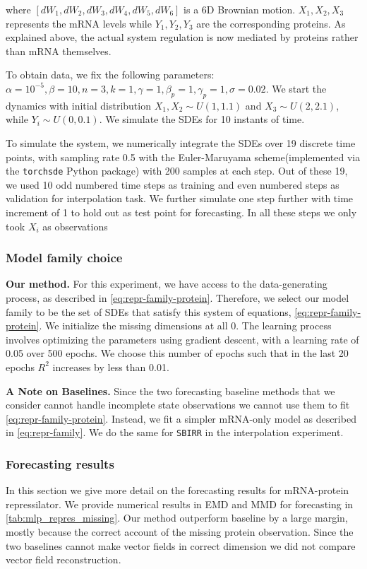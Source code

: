 where $[dW_1,dW_2,dW_3, dW_4, dW_5, dW_6]$ is a 6D Brownian motion. $X_1,X_2,X_3$ represents the mRNA levels while $Y_1, Y_2, Y_3$ are the corresponding proteins. As explained above, the actual system regulation is now mediated by proteins rather than mRNA themselves. 

To obtain data, we fix the following parameters: $\alpha = 10^{-5}, \beta = 10, n=3, k = 1, \gamma = 1,\beta_p=1, \gamma_p = 1, \sigma = 0.02$. We start the dynamics with initial distribution $X_1, X_2\sim U(1,1.1)$ and $X_3\sim U(2,2.1)$, while $Y_i\sim U(0,0.1)$. We simulate the SDEs for 10 instants of time. 

To simulate the system, we numerically integrate the SDEs over 19 discrete time points, with sampling rate 0.5 with the Euler-Maruyama scheme(implemented via the \texttt{torchsde} Python package) with 200 samples at each step. Out of these 19, we used 10 odd numbered time steps as training and even numbered steps as validation for interpolation task. We further simulate one step further with time increment of 1 to hold out as test point for forecasting. In all these steps we only took $X_i$ as observations

\subsubsection{Model family choice}
\label{app:repr_implementation_protein}
\textbf{Our method.} For this experiment, we have access to the data-generating process, as described in \cref{eq:repr-family-protein}. Therefore, we select our model family to be the set of SDEs that satisfy this system of equations, \cref{eq:repr-family-protein}. We initialize the missing dimensions at all 0. The learning process involves optimizing the parameters using gradient descent, with a learning rate of 0.05 over 500 epochs. We choose this number of epochs such that in the last 20 epochs $R^2$ increases by less than 0.01.

\textbf{A Note on Baselines.} Since the two forecasting baseline methods that we consider cannot handle incomplete state observations we cannot use them to fit \cref{eq:repr-family-protein}. Instead, we fit a simpler mRNA-only model as described in \cref{eq:repr-family}. We do the same for \texttt{SBIRR} in the interpolation experiment. 



\subsubsection{Forecasting results}
\label{app:repr-missing-forecast}
In this section we give more detail on the forecasting results for mRNA-protein repressilator. We provide numerical results in EMD and MMD for forecasting in \cref{tab:mlp_repres_missing}. Our method outperform baseline by a large margin, mostly because the correct account of the missing protein observation. Since the two baselines cannot make vector fields in correct dimension we did not compare vector field reconstruction. 

